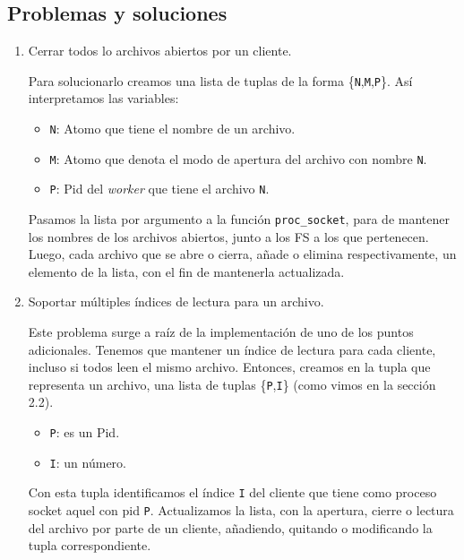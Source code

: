 \documentclass[a4paper, 8pt]{article}
\begin{document}
\subsection{Problemas y soluciones}

\begin{enumerate}
%   
%   
  \item Cerrar todos lo archivos abiertos por un cliente.
  
  Para solucionarlo creamos una lista de tuplas de la forma \{\texttt{N},\texttt{M},\texttt{P}\}. Así interpretamos las variables:
  
  \begin{itemize}
    \item \texttt{N}: Atomo que tiene el nombre de un archivo.
    \item \texttt{M}: Atomo que denota el modo de apertura del archivo con nombre \texttt{N}.
    \item \texttt{P}: Pid del \textit{worker} que tiene el archivo \texttt{N}.
  \end{itemize}
  
  Pasamos la lista por argumento a la función \texttt{proc\_socket}, para de mantener los
  nombres de los archivos abiertos, junto a los FS a los que pertenecen.
  Luego, cada archivo que se abre o cierra, añade o elimina respectivamente, un elemento de la lista, con el fin de mantenerla actualizada.
  
  \item Soportar múltiples índices de lectura para un archivo.
  
  Este problema surge a raíz de la implementación de uno de los puntos adicionales. Tenemos que mantener un índice de lectura para cada cliente,
  incluso si todos leen el mismo archivo.
  Entonces, creamos en la tupla que representa un archivo, una lista de tuplas \{\texttt{P},\texttt{I}\} (como vimos en la sección 2.2).
  
  \begin{itemize}
    \item \texttt{P}: es un Pid.
    \item \texttt{I}: un número.
  \end{itemize}
  
  Con esta tupla identificamos el índice \texttt{I} del cliente que tiene como proceso socket aquel con pid \texttt{P}.
  Actualizamos la lista, con la apertura, cierre o lectura del archivo por parte de un cliente, añadiendo, quitando o modificando la tupla correspondiente.
\end{enumerate}
\end{document}
